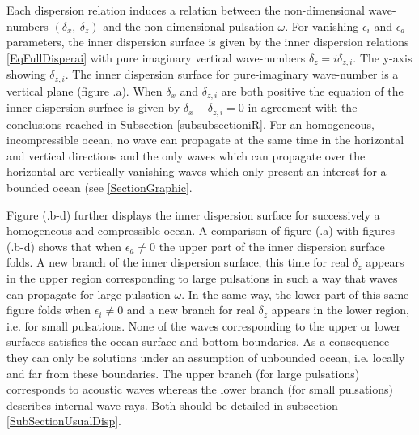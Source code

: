 \documentclass[a4paper,11pt]{article}
\begin{document}

Each dispersion relation induces a relation between the non-dimensional wave-numbers $(\delta_x,\ \delta_z)$ and the non-dimensional pulsation $\omega$. For vanishing $\epsilon_i$ and $\epsilon_a$ parameters, the inner dispersion surface is given by the inner dispersion relations \ref{EqFullDisperai} with pure imaginary vertical wave-numbers $\delta_z=i\delta_{z,i}$. The y-axis showing $\delta_{z,i}$. The inner dispersion surface for pure-imaginary wave-number is a vertical plane (figure .a). When $\delta_x$ and $\delta_{z,i}$ are both positive the equation of the inner dispersion surface is given by $\delta_x-\delta_{z,i} =0$ in agreement with the conclusions reached in Subsection \ref{subsubsectioniR}. For an homogeneous, incompressible ocean, no wave can propagate at the same time in the horizontal and vertical directions and the only waves which can propagate over the horizontal are vertically vanishing waves which only present an interest for a bounded ocean (see \ref{SectionGraphic}.

Figure (.b-d) further displays the inner dispersion surface for successively a homogeneous and compressible ocean. A comparison of figure (.a) with figures (.b-d) shows that when $\epsilon_a \neq 0$ the upper part of the inner dispersion surface folds. A new branch of the inner dispersion surface, this time for real $\delta_z$ appears in the upper region corresponding to large pulsations in such a way that waves can propagate for large pulsation $\omega$. In the same way, the lower part of this same figure folds when $\epsilon_i \neq 0$ and a new branch for real $\delta_z$ appears in the lower region, i.e. for small pulsations. None of the waves corresponding to the upper or lower surfaces satisfies the ocean surface and bottom boundaries. As a consequence they can only be solutions under an assumption of unbounded ocean, i.e. locally and far from these boundaries. The upper branch (for large pulsations) corresponds to acoustic waves whereas the lower branch (for small pulsations) describes internal wave rays. Both should be detailed in subsection \ref{SubSectionUsualDisp}.
\end{document}
